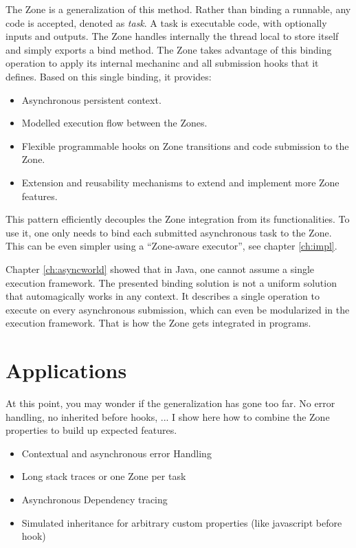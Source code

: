 The Zone is a generalization of this method. Rather than binding a runnable, any code is accepted, denoted as \emph{task}. A task is executable code, with optionally inputs and outputs. The Zone handles internally the thread local to store itself and simply exports a bind method.
The Zone takes advantage of this binding operation to apply its internal mechaninc and all submission hooks that it defines. Based on this single binding, it provides:
\begin{itemize}
\item Asynchronous persistent context.
\item Modelled execution flow between the Zones.
\item Flexible programmable hooks on Zone transitions and code submission to the Zone.
\item Extension and reusability mechanisms to extend and implement more Zone features.
\end{itemize}


This pattern efficiently decouples the Zone integration from its functionalities. To use it, one only needs to bind each submitted asynchronous task to the Zone. This can be even simpler using a ``Zone-aware executor'', see chapter \ref{ch:impl}.

Chapter \ref{ch:asyncworld} showed that in Java, one cannot assume a single execution framework. The presented binding solution is not a uniform solution that automagically works in any context. It describes a single operation to execute on every asynchronous submission, which can even be modularized in the execution framework. That is how the Zone gets integrated in programs.


\section{Applications} %

At this point, you may wonder if the generalization has gone too far. No error handling, no inherited before hooks, ... I show here how to combine the Zone properties to build up expected features.

\begin{itemize}
\item Contextual and asynchronous error Handling
\item Long stack traces or one Zone per task
\item Asynchronous Dependency tracing
\item Simulated inheritance for arbitrary custom properties (like javascript before hook)
\end{itemize}